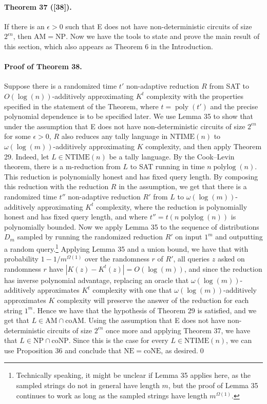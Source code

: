 \paragraph{Theorem 37 ([38]).} If there is an $\epsilon>0$ such that E does not have non-deterministic circuits of size $2^{\epsilon n}$, then $\mathrm{AM}=\mathrm{NP}$.
Now we have the tools to state and prove the main result of this section, which also appears as Theorem 6 in the Introduction.
\paragraph{Proof of Theorem 38.} Suppose there is a randomized time $t'$ non-adaptive reduction $R$ from SAT to $O(\log(n))$-additively approximating $K^t$ complexity with the properties specified in the statement of the Theorem, where $t=\operatorname{poly}(t')$ and the precise polynomial dependence is to be specified later. We use Lemma 35 to show that under the assumption that E does not have non-deterministic circuits of size $2^{\epsilon n}$ for some $\epsilon>0$, $R$ also reduces any tally language in $\mathrm{NTIME}(n)$ to $\omega(\log(m))$-additively approximating $K$ complexity, and then apply Theorem 29.
Indeed, let $L\in\mathrm{NTIME}(n)$ be a tally language. By the Cook--Levin theorem, there is a m-reduction from $L$ to SAT running in time $n\operatorname{polylog}(n)$. This reduction is polynomially honest and has fixed query length. By composing this reduction with the reduction $R$ in the assumption, we get that there is a randomized time $t''$ non-adaptive reduction $R'$ from $L$ to $\omega(\log(m))$-additively approximating $K^t$ complexity, where the reduction is polynomially honest and has fixed query length, and where $t''=t(n\operatorname{polylog}(n))$ is polynomially bounded.
Now we apply Lemma 35 to the sequence of distributions $D_m$ sampled by running the randomized reduction $R'$ on input $1^m$ and outputting a random query.\footnote{Technically speaking, it might be unclear if Lemma 35 applies here, as the sampled strings do not in general have length $m$, but the proof of Lemma 35 continues to work as long as the sampled strings have length $m^{\Omega(1)}$.} Applying Lemma 35 and a union bound, we have that with probability $1-1/m^{\Omega(1)}$ over the randomness $r$ of $R'$, all queries $z$ asked on randomness $r$ have $|K(z)-K^t(z)|=O(\log(m))$, and since the reduction has inverse polynomial advantage, replacing an oracle that $\omega(\log(m))$-additively approximates $K^t$ complexity with one that $\omega(\log(m))$-additively approximates $K$ complexity will preserve the answer of the reduction for each string $1^m$. Hence we have that the hypothesis of Theorem 29 is satisfied, and we get that $L\in\mathrm{AM}\cap\mathrm{coAM}$.
Using the assumption that E does not have non-deterministic circuits of size $2^{\epsilon n}$ once more and applying Theorem 37, we have that $L\in\mathrm{NP}\cap\mathrm{coNP}$. Since this is the case for every $L\in\mathrm{NTIME}(n)$, we can use Proposition 36 and conclude that $\mathrm{NE}=\mathrm{coNE}$, as desired.\qed
